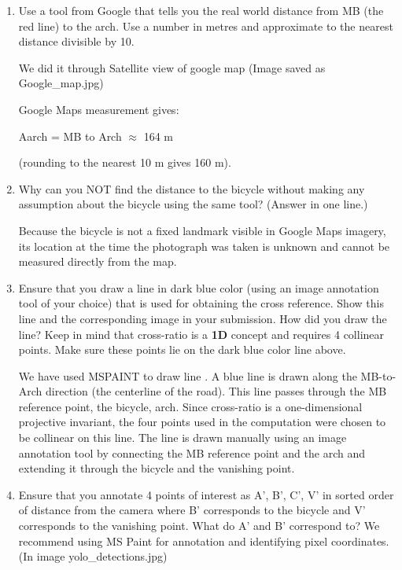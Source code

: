 \documentclass[12pt,a4paper]{article}
\newenvironment{studentSpace}{\par\medskip\noindent}{\par\bigskip}
\begin{document}
\begin{enumerate}

\item Use a tool from Google that tells you the real world distance from MB (the red line) to the arch. Use a number in metres and approximate to the nearest distance divisible by 10.

\begin{studentSpace}
We did it through Satellite view of google map (Image saved as Google_map.jpg)

Google Maps measurement gives:

Aarch = MB to Arch $\approx$ 164 m

(rounding to the nearest 10 m gives 160 m).
\end{studentSpace}

\item Why can you NOT find the distance to the bicycle without making any assumption about the bicycle using the same tool? (Answer in one line.)

\begin{studentSpace}
Because the bicycle is not a fixed landmark visible in Google Maps imagery, its location at the time the photograph was taken is unknown and cannot be measured directly from the map.
\end{studentSpace}

\item Ensure that you draw a line in dark blue color (using an image annotation tool of your choice) that is used for obtaining the cross reference. Show this line and the corresponding image in your submission. How did you draw the line? Keep in mind that cross-ratio is a \textbf{1D} concept and requires 4 collinear points. Make sure these points lie on the dark blue color line above.

\begin{studentSpace}
We have used MSPAINT to draw line . A blue line is drawn along the MB-to-Arch direction (the centerline of the road). This line passes through the MB reference point, the bicycle, arch. Since cross-ratio is a one-dimensional projective invariant, the four points used in the computation were chosen to be collinear on this line. The line is drawn manually using an image annotation tool by connecting the MB reference point and the arch and extending it through the bicycle and the vanishing point.
\end{studentSpace}

\item Ensure that you annotate 4 points of interest as A', B', C', V' in sorted order of distance from the camera where B' corresponds to the bicycle and V' corresponds to the vanishing point. What do A' and B' correspond to?
We recommend using MS Paint for annotation and identifying pixel coordinates.(In image yolo_detections.jpg)


\end{enumerate}
\end{document}
